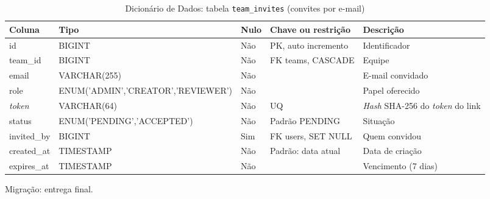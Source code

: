 \begin{table}[H]
\centering
\footnotesize
\caption{Dicionário de Dados: tabela \texttt{team\_\allowbreak{}invites} (convites por e-mail)}
\label{tab:dd-team-invites}
\begin{tabular}{|>{\raggedright\arraybackslash}p{3.0cm}|>{\raggedright\arraybackslash}p{3.2cm}|>{\centering\arraybackslash}p{0.8cm}|>{\raggedright\arraybackslash}p{3.0cm}|>{\raggedright\arraybackslash}p{3.8cm}|}
\hline
\textbf{Coluna} & \textbf{Tipo} & \textbf{Nulo} & \textbf{Chave ou restrição} & \textbf{Descrição} \\
\hline
id & BIGINT & Não & PK, auto incremento & Identificador \\
\hline
team\_\allowbreak{}id & BIGINT & Não & FK teams, CASCADE & Equipe \\
\hline
email & VARCHAR(255) & Não &  & E-mail convidado \\
\hline
role & ENUM('ADMIN',\allowbreak 'CREATOR',\allowbreak 'REVIEWER') & Não &  & Papel oferecido \\
\hline
\textit{token} & VARCHAR(64) & Não & UQ & \textit{Hash} SHA-256 do \textit{token} do link \\
\hline
status & ENUM('PENDING',\allowbreak 'ACCEPTED') & Não & Padrão PENDING & Situação \\
\hline
invited\_\allowbreak{}by & BIGINT & Sim & FK users, SET NULL & Quem convidou \\
\hline
created\_\allowbreak{}at & TIMESTAMP & Não & Padrão: data atual & Data de criação \\
\hline
expires\_\allowbreak{}at & TIMESTAMP & Não &  & Vencimento (7 dias) \\
\hline
\end{tabular}
\par\footnotesize Migração: entrega final.
\end{table}

